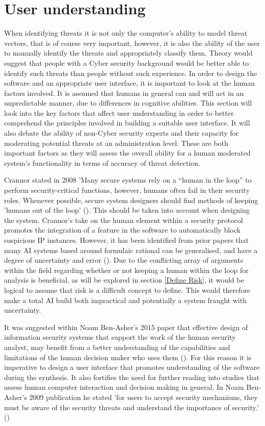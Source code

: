 
\section{User understanding} \label{UI Theory}
When identifying threats it is not only the computer's ability to model threat vectors, that is of course very important, however, it is also the ability of the user to manually identify the threats and appropriately classify them. Theory would suggest that people with a Cyber security background would be better able to identify such threats than people without such experience. In order to design the software and an appropriate user interface, it is important to look at the human factors involved. It is assumed that humans in general can and will act in an unpredictable manner, due to differences in cognitive abilities. This section will look into the key factors that affect user understanding in order to better comprehend the principles involved in building a suitable user interface. It will also debate the ability of non-Cyber security experts and their capacity for moderating potential threats at an administration level. These are both important factors as they will assess the overall ability for a human moderated system's functionality in terms of accuracy of threat detection.

Crannor stated in 2008 'Many secure systems rely on a “human in the loop” to perform security-critical functions, however, humans often fail in their security roles. Whenever possible, secure system designers should find methods of keeping 'humans out of the loop' (\cite{cranor2008framework}). This should be taken into account when designing the system. Crannor's take on the human element within a security protocol promotes the integration of a feature in the software to automatically block suspicious IP instances. However, it has been identified from prior papers that many AI systems based around formulaic rational can be generalised, and have a degree of uncertainty and error (\cite{kim2008slow}). Due to the conflicting array of arguments within the field regarding whether or not keeping a human within the loop for analysis is beneficial, as will be explored in section \ref{Define Risk}, it would be logical to assume that risk is a difficult concept to define. This would therefore make a total AI build both impractical and potentially a system fraught with uncertainty.

It was suggested within Noam Ben-Asher's 2015 paper that effective design of information security systems that support the work of the human security analyst, may benefit from a better understanding of the capabilities and limitations of the human decision maker who uses them (\cite{ben2015effects}). For this reason it is imperative to design a user interface that promotes understanding of the software during the synthesis. It also fortifies the need for further reading into studies that assess human computer interaction and decision making in general. In Noam Ben-Asher's 2009 publication he stated 'for users to accept security mechanisms, they must be aware of the security threats and understand the importance of security.' (\cite{ben2009experimental})

